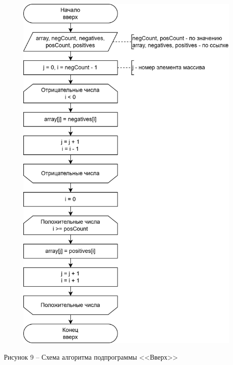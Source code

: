 \documentclass[a4paper,14pt]{extarticle}
\begin{document}
  \pagebreak
  \begin{figure}[h]
    \centering
    \includegraphics[width=0.65\linewidth]{images/s-2-5}
  \end{figure}
  \begin{center}
    Рисунок 9 – Схема алгоритма подпрограммы <<Вверх>>
  \end{center}
\end{document}
